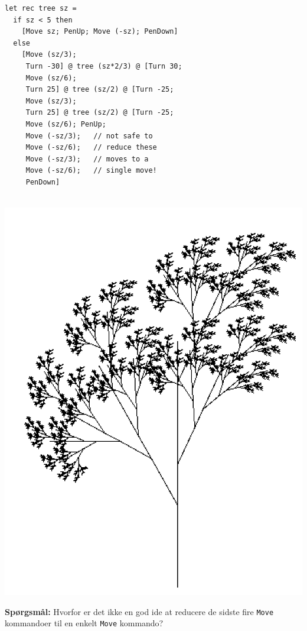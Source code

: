 \documentclass[rgb]{beamer}
\begin{document}
\begin{frame}[fragile]
\begin{footnotesize}

  \vspace{1ex}

\begin{minipage}{0.68\textwidth}

\begin{lstlisting}[numbers=none,frame=none,mathescape]
let rec tree sz =
  if sz < 5 then
    [Move sz; PenUp; Move (-sz); PenDown]
  else
    [Move (sz/3);
     Turn -30] @ tree (sz*2/3) @ [Turn 30;
     Move (sz/6);
     Turn 25] @ tree (sz/2) @ [Turn -25;
     Move (sz/3);
     Turn 25] @ tree (sz/2) @ [Turn -25;
     Move (sz/6); PenUp;
     Move (-sz/3);   // not safe to
     Move (-sz/6);   // reduce these
     Move (-sz/3);   // moves to a
     Move (-sz/6);   // single move!
     PenDown]
\end{lstlisting}
\end{minipage}
\begin{minipage}{0.3\textwidth}

  ~\hspace{-5mm}\includegraphics[width=1.2\textwidth]{../images/tree.png}

\end{minipage}

\vspace{1ex}
\textbf{Spørgsmål:} Hvorfor er det ikke en god ide at reducere de sidste fire
    \lstinline{Move} kommandoer til en enkelt \lstinline{Move}
    kommando?

\end{footnotesize}
\end{frame}
\end{document}
